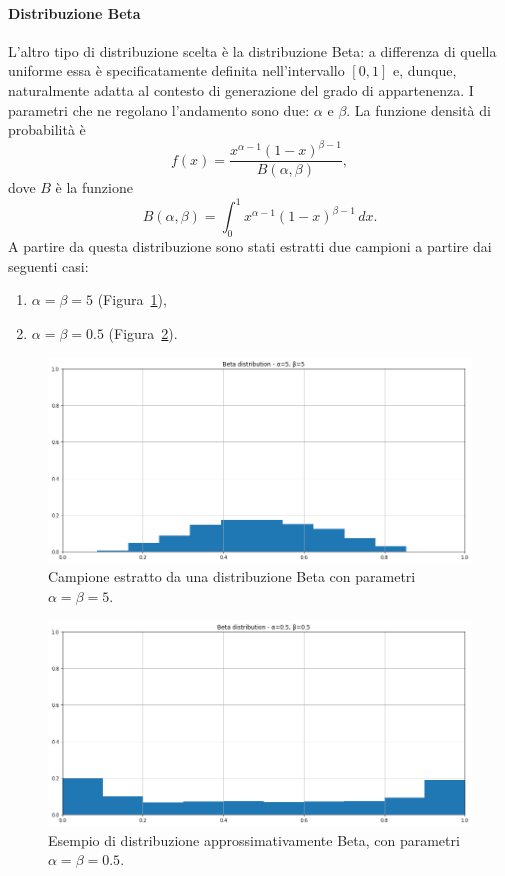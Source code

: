 \documentclass[12pt]{report}
\theoremstyle{definition}
\begin{document}
\paragraph{Distribuzione Beta}
L'altro tipo di distribuzione scelta è la distribuzione Beta: a differenza di quella uniforme essa è specificatamente definita nell'intervallo $[0,1]$ e, dunque, naturalmente adatta al contesto di generazione del grado di appartenenza. I parametri che ne regolano l'andamento sono due: $\alpha$ e $\beta$. La funzione densità di probabilità è
\begin{equation}
    f(x)= \frac{x^{\alpha - 1}(1-x)^{\beta - 1}}{B(\alpha, \beta)},
\end{equation}
dove $B$ è la funzione
\begin{equation}
    B(\alpha, \beta) = \int_{0}^{1} x^{\alpha - 1}(1-x)^{\beta - 1} \,dx.
\end{equation}
A partire da questa distribuzione sono stati estratti due campioni a partire dai seguenti casi:
\begin{enumerate}
    \item $\alpha = \beta = 5$ (Figura~\ref{beta5}),
    \item $\alpha = \beta = 0.5$ (Figura~\ref{beta05}).
\end{enumerate}
\begin{figure}
    \centering
    \includegraphics[scale=0.4]{images/beta5.png}
    \caption{Campione estratto da una distribuzione Beta con parametri $\alpha = \beta = 5$.}
    \label{beta5}
\end{figure}
\begin{figure}
    \centering
    \includegraphics[scale=0.4]{images/beta05.png}
    \caption{Esempio di distribuzione approssimativamente Beta, con parametri $\alpha = \beta = 0.5$.}
    \label{beta05}
\end{figure}
\end{document}
